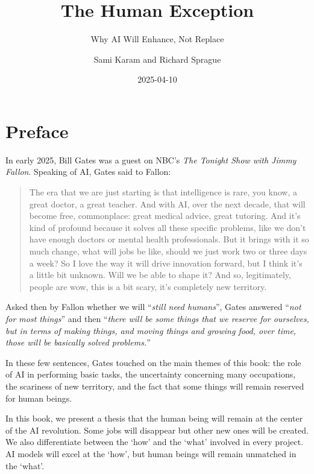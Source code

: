 \documentclass[
  Letterpaper,
]{scrbook}
\title{The Human Exception}
\subtitle{Why AI Will Enhance, Not Replace}
\author{Sami Karam and Richard Sprague}
\date{2025-04-10}
\renewcommand*\contentsname{Table of contents}
\newcommand\contentsname{Table of contents}
\begin{document}
\frontmatter
\maketitle

\renewcommand*\contentsname{Table of contents}
{
\setcounter{tocdepth}{2}
\tableofcontents
}

\mainmatter
{}

\chapter*{Preface}\label{preface}


In early 2025, Bill Gates was a guest on NBC's \emph{The Tonight Show
with Jimmy Fallon}. Speaking of AI, Gates said to Fallon:

\begin{quote}
The era that we are just starting is that intelligence is rare, you
know, a great doctor, a great teacher. And with AI, over the next
decade, that will become free, commonplace: great medical advice, great
tutoring. And it's kind of profound because it solves all these specific
problems, like we don't have enough doctors or mental health
professionals. But it brings with it so much change, what will jobs be
like, should we just work two or three days a week? So I love the way it
will drive innovation forward, but I think it's a little bit unknown.
Will we be able to shape it? And so, legitimately, people are wow, this
is a bit scary, it's completely new territory.
\end{quote}

Asked then by Fallon whether we will ``\emph{still need humans}'', Gates
answered ``\emph{not for most things}'' and then ``\emph{there will be
some things that we reserve for ourselves, but in terms of making
things, and moving things and growing food, over time, those will be
basically solved problems.}''

In these few sentences, Gates touched on the main themes of this book:
the role of AI in performing basic tasks, the uncertainty concerning
many occupations, the scariness of new territory, and the fact that some
things will remain reserved for human beings.

In this book, we present a thesis that the human being will remain at
the center of the AI revolution. Some jobs will disappear but other new
ones will be created. We also differentiate between the `how' and the
`what' involved in every project. AI models will excel at the `how', but
human beings will remain unmatched in the `what'.
\end{document}
